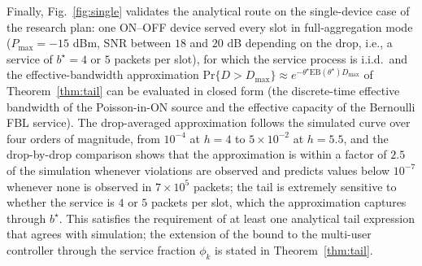 \documentclass[journal]{IEEEtran}
\renewcommand{\Pr}{\mathrm{Pr}}
\newcommand{\Dmax}{D_{\max}}
\begin{document}
Finally, Fig.~\ref{fig:single} validates the analytical route on the single-device case of the research plan: one ON--OFF device served every slot in full-aggregation mode ($P_{\max}=-15$ dBm, SNR between $18$ and $20$ dB depending on the drop, i.e., a service of $b^\star=4$ or $5$ packets per slot), for which the service process is i.i.d.\ and the effective-bandwidth approximation $\Pr\{D>\Dmax\}\approx e^{-\theta^\star\mathrm{EB}(\theta^\star)\Dmax}$ of Theorem~\ref{thm:tail} can be evaluated in closed form (the discrete-time effective bandwidth of the Poisson-in-ON source and the effective capacity of the Bernoulli FBL service). The drop-averaged approximation follows the simulated curve over four orders of magnitude, from $10^{-4}$ at $h=4$ to $5\times10^{-2}$ at $h=5.5$, and the drop-by-drop comparison shows that the approximation is within a factor of $2.5$ of the simulation whenever violations are observed and predicts values below $10^{-7}$ whenever none is observed in $7\times10^{5}$ packets; the tail is extremely sensitive to whether the service is $4$ or $5$ packets per slot, which the approximation captures through $b^\star$. This satisfies the requirement of at least one analytical tail expression that agrees with simulation; the extension of the bound to the multi-user controller through the service fraction $\phi_k$ is stated in Theorem~\ref{thm:tail}.
\end{document}
